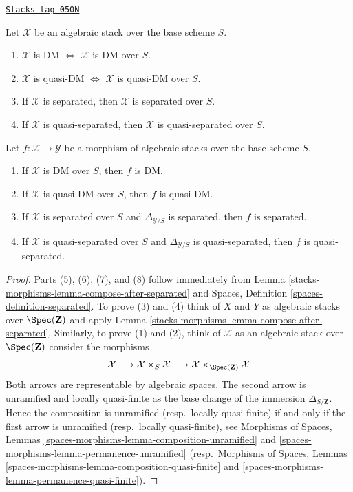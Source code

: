 \begin{lemma}
\label{stacks-morphisms-lemma-separated-implies-morphism-separated}
\href{https://stacks.math.columbia.edu/tag/050N}{\texttt{Stacks tag 050N}}

Let $\mathcal{X}$ be an algebraic stack over the base scheme $S$.
\begin{enumerate}
\item
$\mathcal{X}$ is DM $\Leftrightarrow$
$\mathcal{X}$ is DM over $S$.
\item
$\mathcal{X}$ is quasi-DM $\Leftrightarrow$
$\mathcal{X}$ is quasi-DM over $S$.
\item If $\mathcal{X}$ is separated, then
$\mathcal{X}$ is separated over $S$.
\item If $\mathcal{X}$ is quasi-separated, then
$\mathcal{X}$ is quasi-separated over $S$.
\end{enumerate}
Let $f : \mathcal{X} \to \mathcal{Y}$ be a morphism of algebraic stacks
over the base scheme $S$.
\begin{enumerate}
\item[(5)] If $\mathcal{X}$ is DM over $S$, then $f$ is DM.
\item[(6)] If $\mathcal{X}$ is quasi-DM over $S$, then $f$ is quasi-DM.
\item[(7)] If $\mathcal{X}$ is separated over $S$ and
$\Delta_{\mathcal{Y}/S}$ is separated, then $f$ is separated.
\item[(8)] If $\mathcal{X}$ is quasi-separated over $S$ and
$\Delta_{\mathcal{Y}/S}$ is quasi-separated, then $f$ is quasi-separated.
\end{enumerate}
\end{lemma}

\begin{proof}
Parts (5), (6), (7), and (8) follow immediately from
Lemma \ref{stacks-morphisms-lemma-compose-after-separated}
and
Spaces, Definition \ref{spaces-definition-separated}.
To prove (3) and (4) think of $X$ and $Y$ as algebraic stacks over
$\Spec(\mathbf{Z})$ and apply
Lemma \ref{stacks-morphisms-lemma-compose-after-separated}.
Similarly, to prove (1) and (2), think of $\mathcal{X}$ as an algebraic
stack over $\Spec(\mathbf{Z})$ consider the
morphisms
$$
\mathcal{X} \longrightarrow
\mathcal{X} \times_S \mathcal{X} \longrightarrow
\mathcal{X} \times_{\Spec(\mathbf{Z})} \mathcal{X}
$$
Both arrows are representable by algebraic spaces.
The second arrow is unramified and locally quasi-finite as the base change of
the immersion $\Delta_{S/\mathbf{Z}}$. Hence the composition is
unramified (resp.\ locally quasi-finite) if and only if the first arrow
is unramified (resp.\ locally quasi-finite), see
Morphisms of Spaces,
Lemmas \ref{spaces-morphisms-lemma-composition-unramified} and
\ref{spaces-morphisms-lemma-permanence-unramified}
(resp.\ Morphisms of Spaces,
Lemmas \ref{spaces-morphisms-lemma-composition-quasi-finite} and
\ref{spaces-morphisms-lemma-permanence-quasi-finite}).
\end{proof}

